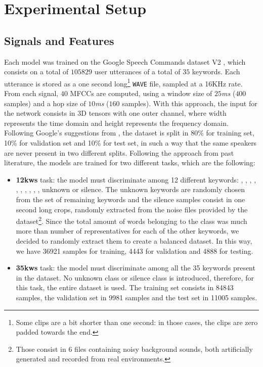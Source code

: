 \section{Experimental Setup}

\subsection{Signals and Features}
\label{sec:sig&features}


Each model was trained on the Google Speech Commands dataset V2 \cite{speechdataset2018warden}, which consists on a total of $105829$ user utterances of a total of $35$ keywords. Each utterance is stored as a one second long\footnote{Some clips are a bit shorter than one second: in those cases, the clips are zero padded towards the end.} \verb|WAVE| file, sampled at a 16KHz rate. From each signal, $40$ MFCCs are computed, using a window size of $25$\textit{ms} ($400$ samples) and a hop size of $10$\textit{ms} ($160$ samples). With this approach, the input for the network consists in 3D tensors with one outer channel, where width represents the time domain and height represents the frequency domain. Following Google's suggestions from \cite{speechdataset2018warden}, the dataset is split in 80\% for training set, 10\% for validation set and 10\% for test set, in such a way that the same speakers are never present in two different splits. 
Following the approach from past literature, the models are trained for two different tasks, which are the following:
\begin{itemize}
	\item \textbf{12kws} task: the model must discriminate among 12 different keywords: , , , , , , , , , , unknown or silence. The unknown keywords are randomly chosen from the set of remaining keywords and the silence samples consist in one second long crops, randomly extracted from the noise files provided by the dataset\footnote{Those consist in 6 files containing noisy background sounds, both artificially generated and recorded from real environments.}. Since the total amount of words belonging to the  class was much more than number of representatives for each of the other keywords, we decided to randomly extract them to create a balanced dataset. In this way, we have 36921 samples for training, 4443 for validation and 4888 for testing.
	\item \textbf{35kws} task: the model must discriminate among all the 35 keywords present in the dataset. No unknown class or silence class is introduced, therefore, for this task, the entire dataset is used. The training set consists in 84843 samples, the validation set in 9981 samples and the test set in 11005 samples. 
\end{itemize}


